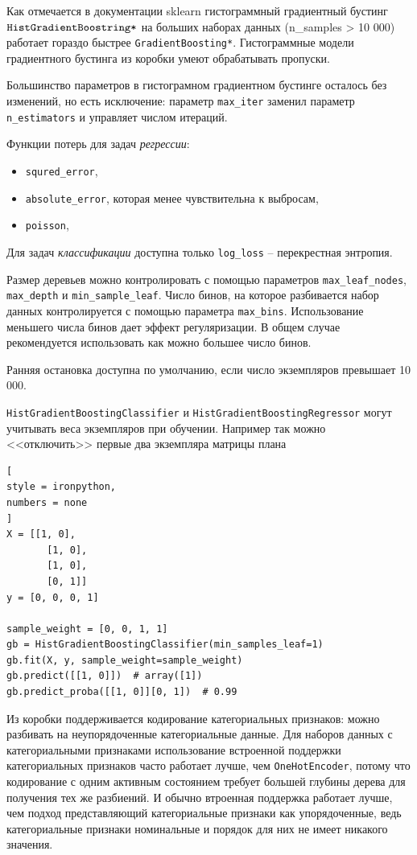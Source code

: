 \documentclass[%
	11pt,
	a4paper,
	utf8,
		]{article}
\begin{document}
Как отмечается в документации sklearn гистограммный градиентный бустинг $ \verb|HistGradientBoostring*| $ на больших наборах данных (n\_samples > 10 000) работает гораздо быстрее \verb|GradientBoosting*|. Гистограммные модели градиентного бустинга из коробки умеют обрабатывать пропуски.

Большинство параметров в гистограмном градиентном бустинге осталось без изменений, но есть исключение: параметр \verb|max_iter| заменил параметр \verb|n_estimators| и управляет числом итераций.

Функции потерь для задач \emph{регрессии}:
\begin{itemize}
	\item \verb|squred_error|,
	
	\item \verb|absolute_error|, которая менее чувствительна к выбросам,
	
	\item \verb|poisson|, 
\end{itemize}

Для задач \emph{классификации} доступна только \verb|log_loss| -- перекрестная энтропия.

Размер деревьев можно контролировать с помощью параметров \verb|max_leaf_nodes|, \verb|max_depth| и \verb|min_sample_leaf|. Число бинов, на которое разбивается набор данных контролируется с помощью параметра \verb|max_bins|. Использование меньшего числа бинов дает эффект регуляризации. В общем случае рекомендуется использовать как можно большее число бинов. 

Ранняя остановка доступна по умолчанию, если число экземпляров превышает 10 000. 

\verb|HistGradientBoostingClassifier| и \verb|HistGradientBoostingRegressor| могут учитывать веса экземпляров при обучении. Например так можно <<отключить>> первые два экземпляра матрицы плана
\begin{lstlisting}[
style = ironpython,
numbers = none	
]
X = [[1, 0],
       [1, 0],
       [1, 0],
       [0, 1]]
y = [0, 0, 0, 1]

sample_weight = [0, 0, 1, 1]
gb = HistGradientBoostingClassifier(min_samples_leaf=1)
gb.fit(X, y, sample_weight=sample_weight)
gb.predict([[1, 0]])  # array([1])
gb.predict_proba([[1, 0]][0, 1])  # 0.99
\end{lstlisting}

Из коробки поддерживается кодирование категориальных признаков: можно разбивать на неупорядоченные категориальные данные. Для наборов данных с категориальными признаками использование встроенной поддержки категориальных признаков часто работает лучше, чем \verb|OneHotEncoder|, потому что кодирование с одним активным состоянием требует большей глубины дерева для получения тех же разбиений. И обычно втроенная поддержка работает лучше, чем подход представляющий категориальные признаки как упорядоченные, ведь категориальные признаки номинальные и порядок для них не имеет никакого значения. 
\end{document}
